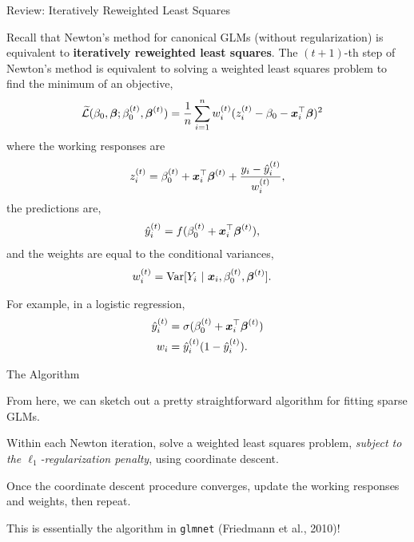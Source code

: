 \documentclass[aspectratio=169]{beamer}
\begin{document}
\begin{frame}[t,allowframebreaks]{Review: Iteratively Reweighted Least
Squares}\label{review-iteratively-reweighted-least-squares}

Recall that Newton's method for canonical GLMs (without regularization)
is equivalent to \textbf{iteratively reweighted least squares}. The
\((t+1)\)-th step of Newton's method is equivalent to solving a weighted
least squares problem to find the minimum of an objective,
\begin{align*}
\widetilde{\mathcal{L}}(\beta_0, \boldsymbol{\beta}; \beta_0^{(t)}, \boldsymbol{\beta}^{(t)})
&= \frac{1}{n} \sum_{i=1}^n w_i^{(t)} (z_i^{(t)} - \beta_0 - \boldsymbol{x}_i^\top \boldsymbol{\beta})^2
\end{align*} where the working responses are \begin{align*}
z_i^{(t)} = \beta_0^{(t)} + \boldsymbol{x}_i^\top \boldsymbol{\beta}^{(t)} + \frac{y_i - \hat{y}_i^{(t)}}{w_i^{(t)}},
\end{align*} the predictions are, \begin{align*}
\hat{y}_i^{(t)} &= f(\beta_0^{(t)} + \boldsymbol{x}_i^\top \boldsymbol{\beta}^{(t)}),
\end{align*} and the weights are equal to the conditional variances,
\begin{align*}
w_i^{(t)} &= \mathrm{Var}[Y_i ~\vert~ \boldsymbol{x}_i, \beta_0^{(t)}, \boldsymbol{\beta}^{(t)}].
\end{align*}

For example, in a logistic regression, \begin{align*}
\hat{y}_i^{(t)} &= \sigma(\beta_0^{(t)} + \boldsymbol{x}_i^\top \boldsymbol{\beta}^{(t)}) \\
w_i &= \hat{y}_i^{(t)} (1 - \hat{y}_i^{(t)}).
\end{align*}
\end{frame}

\begin{frame}[t,allowframebreaks]{The Algorithm}\label{the-algorithm}

From here, we can sketch out a pretty straightforward algorithm for
fitting sparse GLMs. 

Within each Newton iteration, solve a weighted
least squares problem, \emph{subject to the \(\ell_1\)-regularization
penalty}, using coordinate descent. 

Once the coordinate descent
procedure converges, update the working responses and weights, then
repeat. 

This is essentially the algorithm in \texttt{glmnet}
(Friedmann et al., 2010)!
\end{frame}
\end{document}
